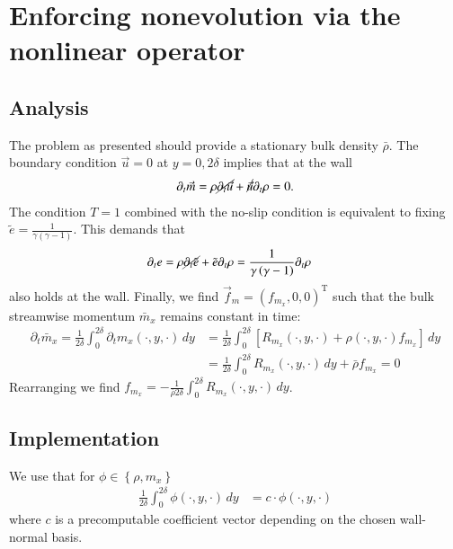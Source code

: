 \documentclass[letterpaper,11pt,nointlimits,reqno]{amsart}
\begin{document}
\section{Enforcing nonevolution via the nonlinear operator}

\subsection{Analysis}

The problem as presented should provide a stationary bulk density $\bar{\rho}$.
The boundary condition $\vec{u} = 0$ at $y = 0,2\delta$ implies that at the
wall
\begin{align}
  \partial_{t} \vec{m}
  =   \rho \cancel{\partial_{t} \vec{u}}
    + \cancel{\vec{u}} \partial_{t} \rho
  = 0.
\end{align}
The condition $T=1$ combined with the no-slip condition is equivalent to fixing
$\tilde{e}=\frac{1}{\gamma\left(\gamma-1\right)}$.  This demands that
\begin{align}
  \partial_{t} e
  &=  \rho \cancel{\partial_{t} \tilde{e}}
    + \tilde{e} \partial_{t} \rho
  = \frac{1}{\gamma\left(\gamma-1\right)} \partial_{t} \rho
\end{align}
also holds at the wall.  Finally, we find $\vec{f}_{m} =
\left(f_{m_x},0,0\right)^{\textrm{T}}$ such that the bulk streamwise momentum
$\bar{m}_{x}$ remains constant in time:
\begin{align}
  \partial_{t} \bar{m}_x
   = \frac{1}{2\delta} \int_{0}^{2\delta}
     \partial_{t} m_{x} \!\left(\cdot,y,\cdot\right) \, dy
  &= \frac{1}{2\delta} \int_{0}^{2\delta}
     \left[  R_{m_x}\!\left(\cdot,y,\cdot\right)
           + \rho\!\left(\cdot,y,\cdot\right)  f_{m_x}
     \right] \, dy
  \\
  &= \frac{1}{2\delta} \int_{0}^{2\delta}
     R_{m_x}\!\left(\cdot,y,\cdot\right) \, dy + \bar{\rho} f_{m_x}
   = 0
\end{align}
Rearranging we find $f_{m_x} = - \frac{1}{\bar{\rho}2\delta}
\int_{0}^{2\delta} R_{m_x}\!\left(\cdot,y,\cdot\right) \, dy$.

\subsection{Implementation}

We use that for
$\phi\in\left\{\rho,m_{x}\right\}$
\begin{align}
  \frac{1}{2\delta} \int_{0}^{2\delta} \phi\!\left(\cdot,y,\cdot\right)\,dy
  &=
  c \cdot \phi\!\left(\cdot,y,\cdot\right)
\end{align}
where $c$ is a precomputable coefficient vector depending on the chosen
wall-normal basis.
\end{document}
